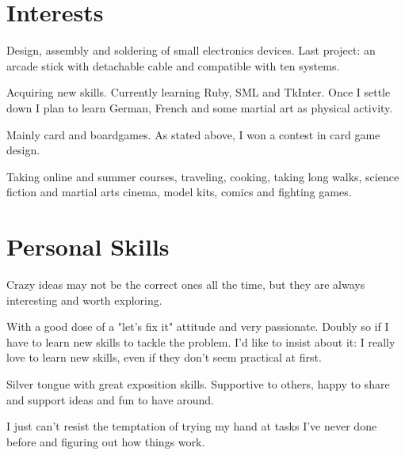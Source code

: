 \documentclass[11pt,a4paper,roman]{moderncv}
\begin{document}

\section{Interests}

	{Design, assembly and soldering of small electronics devices. Last project: an arcade stick with detachable cable and compatible with ten systems.}

	{Acquiring new skills. Currently learning Ruby, SML and TkInter.
	Once I settle down I plan to learn German, French and some martial art as physical activity.}

	{Mainly card and boardgames. As stated above, I won a contest in card game design.}

	{Taking online and summer courses, traveling, cooking, taking long walks, science fiction and martial arts cinema, model kits, comics and fighting games.}



\section{Personal Skills}

{Crazy ideas may not be the correct ones all the time, but they are always interesting and worth exploring.}

{With a good dose of a "let's fix it" attitude and very passionate. Doubly so if I have to learn new skills to tackle the problem. I'd like to insist about it: I really love to learn new skills, even if they don't seem practical at first.}

{Silver tongue with great exposition skills. Supportive to others, happy to share and support ideas and fun to have around.}

{I just can't resist the temptation of trying my hand at tasks I've never done before and figuring out how things work.}
\end{document}
